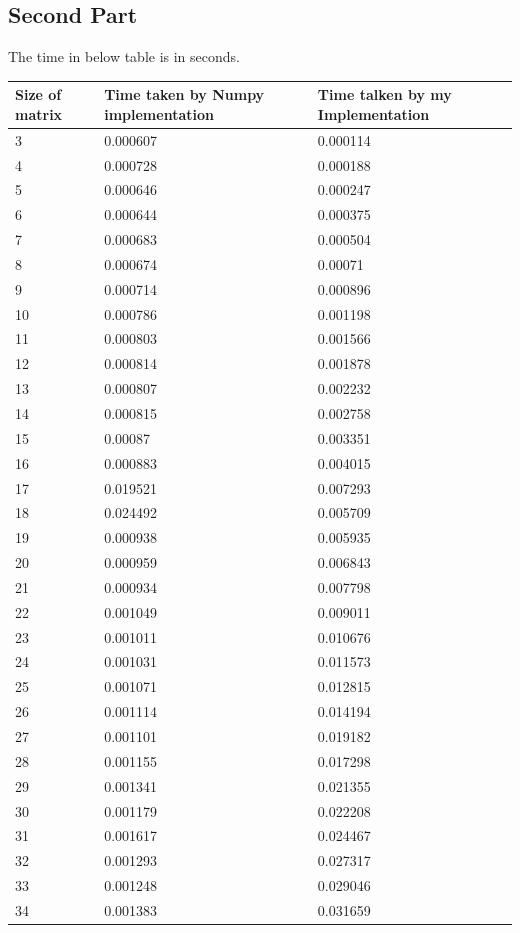 \documentclass[runningheads]{llncs}
\begin{document}
\subsection{Second Part}
The time in below table is in seconds. 
\begin{longtable}{| p{} | p{} | p{} |} 
\hline
Size of matrix & Time taken by Numpy implementation & Time talken by my Implementation\\
\hline
3 & 0.000607 & 0.000114 \\
4 & 0.000728 & 0.000188 \\
5 & 0.000646 & 0.000247 \\
6 & 0.000644 & 0.000375 \\
7 & 0.000683 & 0.000504 \\
8 & 0.000674 & 0.00071 \\
9 & 0.000714 & 0.000896 \\
10 & 0.000786 & 0.001198 \\
11 & 0.000803 & 0.001566 \\
12 & 0.000814 & 0.001878 \\
13 & 0.000807 & 0.002232 \\
14 & 0.000815 & 0.002758 \\
15 & 0.00087 & 0.003351 \\
16 & 0.000883 & 0.004015 \\
17 & 0.019521 & 0.007293 \\
18 & 0.024492 & 0.005709 \\
19 & 0.000938 & 0.005935 \\
20 & 0.000959 & 0.006843 \\
21 & 0.000934 & 0.007798 \\
22 & 0.001049 & 0.009011 \\
23 & 0.001011 & 0.010676 \\
24 & 0.001031 & 0.011573 \\
25 & 0.001071 & 0.012815 \\
26 & 0.001114 & 0.014194 \\
27 & 0.001101 & 0.019182 \\
28 & 0.001155 & 0.017298 \\
29 & 0.001341 & 0.021355 \\
30 & 0.001179 & 0.022208 \\
31 & 0.001617 & 0.024467 \\
32 & 0.001293 & 0.027317 \\
33 & 0.001248 & 0.029046 \\
34 & 0.001383 & 0.031659 \\

\end{longtable}
\end{document}
